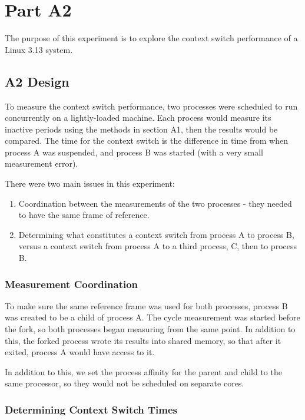 \documentclass[a4paper, 12pt]{article}
\begin{document}
\section{Part A2}

The purpose of this experiment is to explore the context switch performance of a Linux 3.13 system.

\subsection{A2 Design}

To measure the context switch performance, two processes were scheduled to run concurrently on a lightly-loaded machine. Each process would measure its inactive periods using the methods in section A1, then the results would be compared. The time for the context switch is the difference in time from when process A was suspended, and process B was started (with a very small measurement error).

There were two main issues in this experiment:
\begin{enumerate}
\item   Coordination between the measurements of the two processes - they needed to have the same frame of reference.
\item   Determining what constitutes a context switch from process A to process B, versus a context switch from process A to a third process, C, then to process B.
\end{enumerate}

\subsubsection{Measurement Coordination}

To make sure the same reference frame was used for both processes, process B was created to be a child of process A. The cycle measurement was started before the fork, so both processes began measuring from the same point. In addition to this, the forked process wrote its results into shared memory, so that after it exited, process A would have access to it.

In addition to this, we set the process affinity for the parent and child to the same processor, so they would not be scheduled on separate cores.

\subsubsection{Determining Context Switch Times}
\end{document}
